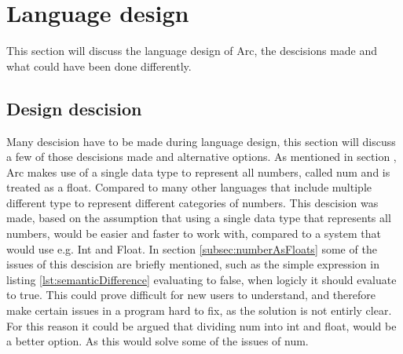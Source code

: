 \section{Language design}

This section will discuss the language design of Arc, the descisions made and what could have been done differently.

\subsection{Design descision} 
Many descision have to be made during language design, this section will discuss a few of those descisions made and alternative options.
As mentioned in section , Arc makes use of a single data type to represent all numbers, called num and is treated as a float. Compared to many other languages that include multiple different type to represent different categories of numbers. This descision was made, based on the assumption that using a single data type that represents all numbers, would be easier and faster to work with, compared to a system that would use e.g. Int and Float. In section \ref{subsec:numberAsFloats} some of the issues of this descision are briefly mentioned, such as the simple expression in listing \ref{lst:semanticDifference} evaluating to false, when logicly it should evaluate to true. This could prove difficult for new users to understand, and therefore make certain issues in a program hard to fix, as the solution is not entirly clear. For this reason it could be argued that dividing num into int and float, would be a better option. As this would solve some of the issues of num.


